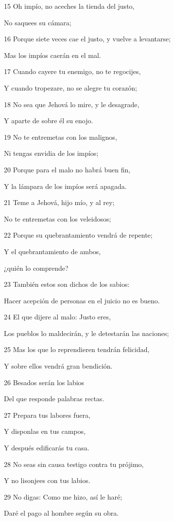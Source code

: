 \par 15 Oh impío, no aceches la tienda del justo,
\par No saquees su cámara;
\par 16 Porque siete veces cae el justo, y vuelve a levantarse;
\par Mas los impíos caerán en el mal.
\par 17 Cuando cayere tu enemigo, no te regocijes,
\par Y cuando tropezare, no se alegre tu corazón;
\par 18 No sea que Jehová lo mire, y le desagrade,
\par Y aparte de sobre él su enojo.
\par 19 No te entremetas con los malignos,
\par Ni tengas envidia de los impíos;
\par 20 Porque para el malo no habrá buen fin,
\par Y la lámpara de los impíos será apagada.
\par 21 Teme a Jehová, hijo mío, y al rey;
\par No te entremetas con los veleidosos;
\par 22 Porque su quebrantamiento vendrá de repente;
\par Y el quebrantamiento de ambos,
\par ¿quién lo comprende?
\par 23 También estos son dichos de los sabios:
\par Hacer acepción de personas en el juicio no es bueno.
\par 24 El que dijere al malo: Justo eres,
\par Los pueblos lo maldecirán, y le detestarán las naciones;
\par 25 Mas los que lo reprendieren tendrán felicidad,
\par Y sobre ellos vendrá gran bendición.
\par 26 Besados serán los labios
\par Del que responde palabras rectas.
\par 27 Prepara tus labores fuera,
\par Y disponlas en tus campos,
\par Y después edificarás tu casa.
\par 28 No seas sin causa testigo contra tu prójimo,
\par Y no lisonjees con tus labios.
\par 29 No digas: Como me hizo, así le haré;
\par Daré el pago al hombre según su obra.
